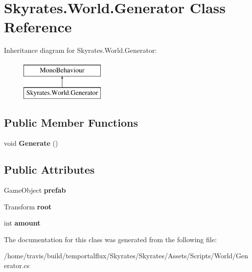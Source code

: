 \hypertarget{class_skyrates_1_1_world_1_1_generator}{\section{Skyrates.\-World.\-Generator Class Reference}
\label{class_skyrates_1_1_world_1_1_generator}
}
Inheritance diagram for Skyrates.\-World.\-Generator\-:\begin{figure}[H]
\begin{center}
\leavevmode
\includegraphics[height=2.000000cm]{class_skyrates_1_1_world_1_1_generator}
\end{center}
\end{figure}
\subsection*{Public Member Functions}
\begin{DoxyCompactItemize}
\item 
\hypertarget{class_skyrates_1_1_world_1_1_generator_a901f7557ca6ef805d360a2d787246fd1}{void {\bfseries Generate} ()}\label{class_skyrates_1_1_world_1_1_generator_a901f7557ca6ef805d360a2d787246fd1}

\end{DoxyCompactItemize}
\subsection*{Public Attributes}
\begin{DoxyCompactItemize}
\item 
\hypertarget{class_skyrates_1_1_world_1_1_generator_ad0e68e34c6a4e3abde497f02293143a8}{Game\-Object {\bfseries prefab}}\label{class_skyrates_1_1_world_1_1_generator_ad0e68e34c6a4e3abde497f02293143a8}

\item 
\hypertarget{class_skyrates_1_1_world_1_1_generator_a2452d55c3299d6742ddd2f8da9d9cb06}{Transform {\bfseries root}}\label{class_skyrates_1_1_world_1_1_generator_a2452d55c3299d6742ddd2f8da9d9cb06}

\item 
\hypertarget{class_skyrates_1_1_world_1_1_generator_a817a64d52b5deadec024a8009309cc22}{int {\bfseries amount}}\label{class_skyrates_1_1_world_1_1_generator_a817a64d52b5deadec024a8009309cc22}

\end{DoxyCompactItemize}


The documentation for this class was generated from the following file\-:\begin{DoxyCompactItemize}
\item 
/home/travis/build/temportalflux/\-Skyrates/\-Skyrates/\-Assets/\-Scripts/\-World/Generator.\-cs\end{DoxyCompactItemize}

